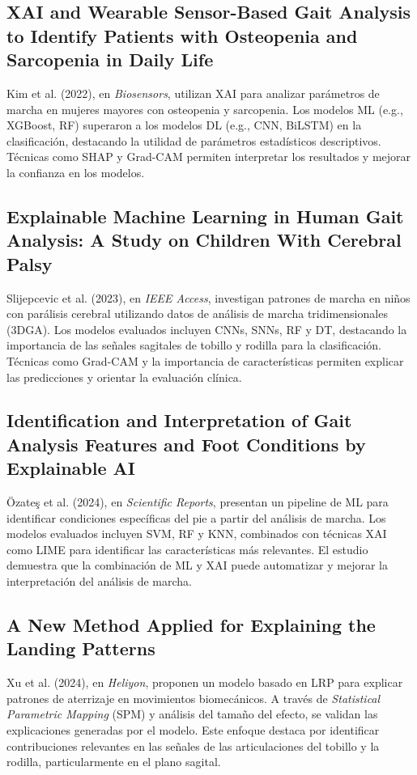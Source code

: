 \documentclass{report}
\begin{document}
\subsection{XAI and Wearable Sensor-Based Gait Analysis to Identify Patients with Osteopenia and Sarcopenia in Daily Life}
Kim et al. (2022), en \textit{Biosensors}, utilizan XAI para analizar parámetros de marcha en mujeres mayores con osteopenia y sarcopenia. Los modelos ML (e.g., XGBoost, RF) superaron a los modelos DL (e.g., CNN, BiLSTM) en la clasificación, destacando la utilidad de parámetros estadísticos descriptivos. Técnicas como SHAP y Grad-CAM permiten interpretar los resultados y mejorar la confianza en los modelos.

\subsection{Explainable Machine Learning in Human Gait Analysis: A Study on Children With Cerebral Palsy}
Slijepcevic et al. (2023), en \textit{IEEE Access}, investigan patrones de marcha en niños con parálisis cerebral utilizando datos de análisis de marcha tridimensionales (3DGA). Los modelos evaluados incluyen CNNs, SNNs, RF y DT, destacando la importancia de las señales sagitales de tobillo y rodilla para la clasificación. Técnicas como Grad-CAM y la importancia de características permiten explicar las predicciones y orientar la evaluación clínica.

\subsection{Identification and Interpretation of Gait Analysis Features and Foot Conditions by Explainable AI}
Özateş et al. (2024), en \textit{Scientific Reports}, presentan un pipeline de ML para identificar condiciones específicas del pie a partir del análisis de marcha. Los modelos evaluados incluyen SVM, RF y KNN, combinados con técnicas XAI como LIME para identificar las características más relevantes. El estudio demuestra que la combinación de ML y XAI puede automatizar y mejorar la interpretación del análisis de marcha.

\subsection{A New Method Applied for Explaining the Landing Patterns}
Xu et al. (2024), en \textit{Heliyon}, proponen un modelo basado en LRP para explicar patrones de aterrizaje en movimientos biomecánicos. A través de \textit{Statistical Parametric Mapping} (SPM) y análisis del tamaño del efecto, se validan las explicaciones generadas por el modelo. Este enfoque destaca por identificar contribuciones relevantes en las señales de las articulaciones del tobillo y la rodilla, particularmente en el plano sagital.
\end{document}
